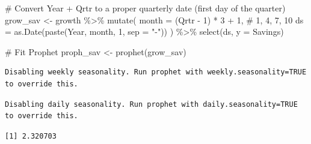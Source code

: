 \documentclass[
  letterpaper,
  DIV=11,
  numbers=noendperiod]{scrartcl}
\newenvironment{Shaded}{\begin{snugshade}}{\end{snugshade}}
\newcommand{\AttributeTok}[1]{\textcolor[rgb]{0.40,0.45,0.13}{#1}}
\newcommand{\CommentTok}[1]{\textcolor[rgb]{0.37,0.37,0.37}{#1}}
\newcommand{\DecValTok}[1]{\textcolor[rgb]{0.68,0.00,0.00}{#1}}
\newcommand{\FunctionTok}[1]{\textcolor[rgb]{0.28,0.35,0.67}{#1}}
\newcommand{\NormalTok}[1]{\textcolor[rgb]{0.00,0.23,0.31}{#1}}
\newcommand{\OtherTok}[1]{\textcolor[rgb]{0.00,0.23,0.31}{#1}}
\newcommand{\SpecialCharTok}[1]{\textcolor[rgb]{0.37,0.37,0.37}{#1}}
\newcommand{\StringTok}[1]{\textcolor[rgb]{0.13,0.47,0.30}{#1}}
\begin{document}
\begin{Shaded}
\begin{Highlighting}[]
\CommentTok{\# Convert Year + Qrtr to a proper quarterly date (first day of the quarter)}
\NormalTok{grow\_sav }\OtherTok{\textless{}{-}}\NormalTok{ growth }\SpecialCharTok{\%\textgreater{}\%}
  \FunctionTok{mutate}\NormalTok{(}
    \AttributeTok{month =}\NormalTok{ (Qrtr }\SpecialCharTok{{-}} \DecValTok{1}\NormalTok{) }\SpecialCharTok{*} \DecValTok{3} \SpecialCharTok{+} \DecValTok{1}\NormalTok{,                     }\CommentTok{\# 1, 4, 7, 10}
    \AttributeTok{ds =} \FunctionTok{as.Date}\NormalTok{(}\FunctionTok{paste}\NormalTok{(Year, month, }\DecValTok{1}\NormalTok{, }\AttributeTok{sep =} \StringTok{"{-}"}\NormalTok{))}
\NormalTok{  ) }\SpecialCharTok{\%\textgreater{}\%}
  \FunctionTok{select}\NormalTok{(ds, }\AttributeTok{y =}\NormalTok{ Savings)}

\CommentTok{\# Fit Prophet}
\NormalTok{proph\_sav }\OtherTok{\textless{}{-}} \FunctionTok{prophet}\NormalTok{(grow\_sav)}
\end{Highlighting}
\end{Shaded}

\begin{verbatim}
Disabling weekly seasonality. Run prophet with weekly.seasonality=TRUE to override this.
\end{verbatim}

\begin{verbatim}
Disabling daily seasonality. Run prophet with daily.seasonality=TRUE to override this.
\end{verbatim}

\begin{Shaded}
\end{Shaded}

\begin{verbatim}
[1] 2.320703
\end{verbatim}
\end{document}
